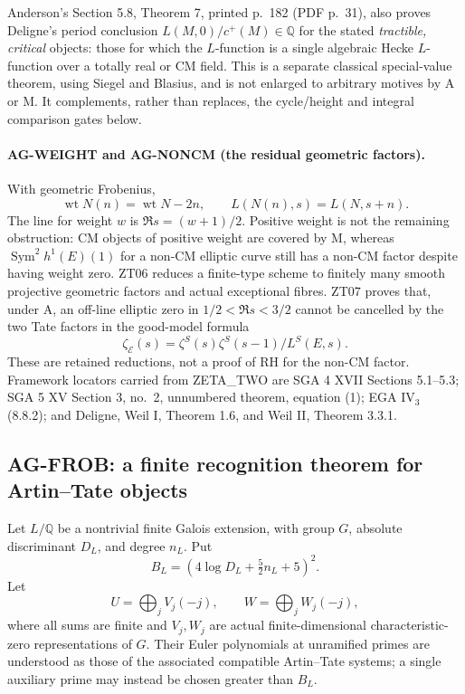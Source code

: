 Anderson's Section 5.8, Theorem 7, printed p.~182 (PDF p.~31), also
proves Deligne's period conclusion
$L(M,0)/c^+(M)\in\mathbb Q$ for the stated \emph{tractible, critical}
objects: those for which the $L$-function is a single algebraic Hecke
$L$-function over a totally real or CM field. This is a separate
classical special-value theorem, using Siegel and Blasius, and is not
enlarged to arbitrary motives by A or M. It complements, rather than
replaces, the cycle/height and integral comparison gates below.

\paragraph{AG-WEIGHT and AG-NONCM (the residual geometric factors).}
With geometric Frobenius,
\[
 \operatorname{wt}N(n)=\operatorname{wt}N-2n,
 \qquad L(N(n),s)=L(N,s+n).
\]
The line for weight $w$ is $\Re s=(w+1)/2$. Positive weight is not the
remaining obstruction: CM objects of positive weight are covered by M,
whereas $\operatorname{Sym}^2h^1(E)(1)$ for a non-CM elliptic curve still
has a non-CM factor despite having weight zero. ZT06 reduces a finite-type
scheme to finitely many smooth projective geometric factors and actual
exceptional fibres. ZT07 proves that, under A, an off-line elliptic zero
in $1/2<\Re s<3/2$ cannot be cancelled by the two Tate factors in the
good-model formula
\[
 \zeta_{\mathcal E}(s)
   =\zeta^S(s)\zeta^S(s-1)/L^S(E,s).
\]
These are retained reductions, not a proof of RH for the non-CM factor.
Framework locators carried from ZETA\_TWO are SGA 4 XVII Sections 5.1--5.3;
SGA 5 XV Section 3, no.~2, unnumbered theorem, equation (1);
EGA IV$_3$ (8.8.2); and Deligne, Weil I, Theorem 1.6, and Weil II,
Theorem 3.3.1.

\subsection{AG-FROB: a finite recognition theorem for Artin--Tate objects}
\label{ag:frob}

Let $L/\mathbb Q$ be a nontrivial finite Galois extension, with group $G$,
absolute discriminant $D_L$, and degree $n_L$. Put
\[
 B_L=(4\log D_L+\tfrac52 n_L+5)^2.
\]
Let
\[
 U=\bigoplus_j V_j(-j),\qquad W=\bigoplus_j W_j(-j),
\]
where all sums are finite and $V_j,W_j$ are actual finite-dimensional
characteristic-zero representations of $G$. Their Euler polynomials at
unramified primes are understood as those of the associated compatible
Artin--Tate systems; a single auxiliary prime may instead be chosen greater
than $B_L$.


